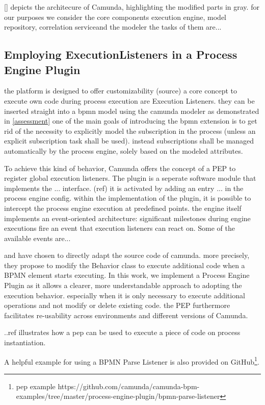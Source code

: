 \autoref{} depicts the architecure of Camunda, highlighting the modified parts in gray.
for our purposes we consider the core components execution engine, model repository, correlation serviceand the modeler
the tasks of them are...

\subsection{Employing ExecutionListeners in a Process Engine Plugin}
the platform is designed to offer customizability (source)
a core concept to execute own code during process execution are Execution Listeners.
they can be inserted straight into a bpmn model using the camunda modeler as demonstrated in \autoref{assessment}
one of the main goals of introducing the bpmn extension is to get rid of the necessity to explicitly model the subscription in the process (unless an explicit subscription task shall be used).
instead subscriptions shall be managed automatically by the process engine, solely based on the modeled attributes.

To achieve this kind of behavior, Camunda offers the concept of a \ac{PEP} to register global execution listeners.
The plugin is a seperate software module that implements the ... interface. (ref)
it is activated by adding an entry ... in the process engine config.
within the implementation of the plugin, it is possible to intercept the process engine execution at predefined points.
the engine itself implements an event-oriented architecture: significant milestones during engine executions fire an event that execution listeners can react on.
Some of the available events are...

\cite{mandal:2017} and \cite{Pufahl2017} have chosen to directly adapt the source code of camunda. more precisely, they propose to modify the Behavior class to execute additional code when a BPMN element starts executing.
In this work, we implement a Process Engine Plugin as it allows a clearer, more understandable approach to adopting the execution behavior. especially when it is only necessary to execute additional operations and not modify or delete existing code.
the PEP furthermore facilitates re-usability across environments and different versions of Camunda.

..ref illustrates how a pep can be used to execute a piece of code on process instantiation.

A helpful example for using a BPMN Parse Listener is also provided on GitHub\footnote{pep example https://github.com/camunda/camunda-bpm-examples/tree/master/process-engine-plugin/bpmn-parse-listener}.

